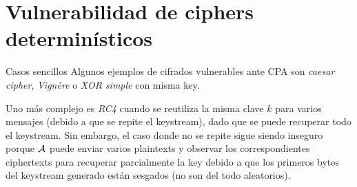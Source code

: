 \section{Vulnerabilidad de ciphers determinísticos}
\begin{frame}{Casos sencillos}
  Algunos ejemplos de cifrados vulnerables ante CPA son \textit{caesar cipher},
  \textit{Vignère} o \textit{XOR simple} con misma key.

  Uno más complejo es \textit{RC4} cuando se reutiliza la misma clave $k$ para varios 
  mensajes (debido a que se repite el keystream), dado que se puede recuperar todo 
  el keystream.
  Sin embargo, el caso donde no se repite sigue siendo inseguro porque $\mathcal{A}$ puede enviar 
  varios plaintexts y observar los correspondientes ciphertexts para recuperar parcialmente 
  la key debido a que los primeros bytes del keystream generado están sesgados (no son del 
  todo aleatorios).
\end{frame}

